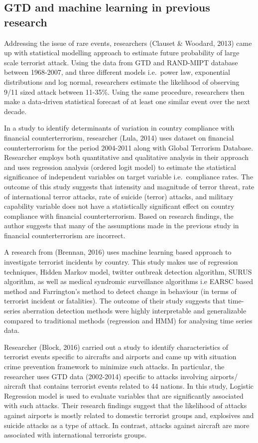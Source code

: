 \documentclass[11pt,oneside,a4paper]{reedthesis}
\begin{document}
\subsection{GTD and machine learning in previous
research}\label{gtd-and-machine-learning-in-previous-research}

Addressing the issue of rare events, researchers (Clauset \& Woodard,
2013) came up with statistical modelling approach to estimate future
probability of large scale terrorist attack. Using the data from GTD and
RAND-MIPT database between 1968-2007, and three different models
i.e.~power law, exponential distributions and log normal, researchers
estimate the likelihood of observing 9/11 sized attack between 11-35\%.
Using the same procedure, researchers then make a data-driven
statistical forecast of at least one similar event over the next decade.

In a study to identify determinants of variation in country compliance
with financial counterterrorism, researcher (Lula, 2014) uses dataset on
financial counterterrorism for the period 2004-2011 along with Global
Terrorism Database. Researcher employs both quantitative and qualitative
analysis in their approach and uses regression analysis (ordered logit
model) to estimate the statistical significance of independent variables
on target variable i.e.~compliance rates. The outcome of this study
suggests that intensity and magnitude of terror threat, rate of
international terror attacks, rate of suicide (terror) attacks, and
military capability variable does not have a statistically significant
effect on country compliance with financial counterterrorism. Based on
research findings, the author suggests that many of the assumptions made
in the previous study in financial counterterrorism are incorrect.

A research from (Brennan, 2016) uses machine learning based approach to
investigate terrorist incidents by country. This study makes use of
regression techniques, Hidden Markov model, twitter outbreak detection
algorithm, SURUS algorithm, as well as medical syndromic surveillance
algorithms i.e EARSC based method and Farrington's method to detect
change in behaviour (in terms of terrorist incident or fatalities). The
outcome of their study suggests that time-series aberration detection
methods were highly interpretable and generalizable compared to
traditional methods (regression and HMM) for analysing time series data.

Researcher (Block, 2016) carried out a study to identify characteristics
of terrorist events specific to aircrafts and airports and came up with
situation crime prevention framework to minimize such attacks. In
particular, the researcher uses GTD data (2002-2014) specific to attacks
involving airports/ aircraft that contains terrorist events related to
44 nations. In this study, Logistic Regression model is used to evaluate
variables that are significantly associated with such attacks. Their
research findings suggest that the likelihood of attacks against
airports is mostly related to domestic terrorist groups and, explosives
and suicide attacks as a type of attack. In contrast, attacks against
aircraft are more associated with international terrorists groups.
\end{document}
